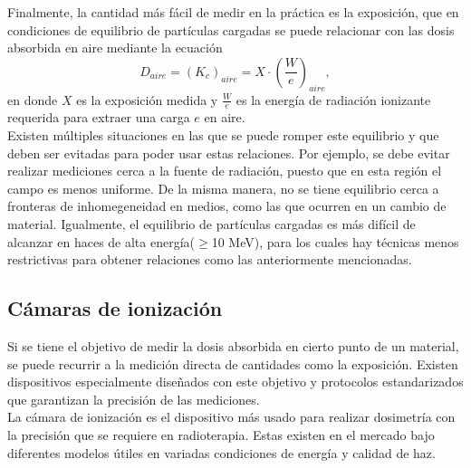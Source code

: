 Finalmente, la cantidad más fácil de medir en la práctica es la exposición, que en condiciones de equilibrio de partículas cargadas se puede relacionar con las dosis absorbida en aire mediante la ecuación \cite{Attix1986}
\begin{equation}
\label{eqn:ExpoDosis}
	D_{aire}=(K_c)_{aire}=X\cdot \left(\frac{W}{e}\right)_{aire},
\end{equation}
en donde $X$ es la exposición medida y  $\frac{W}{e}$ es la energía de radiación ionizante requerida para extraer una carga $e$ en aire.\\

Existen múltiples situaciones en las que se puede romper este equilibrio y que deben ser evitadas para poder usar estas relaciones. Por ejemplo, se debe evitar realizar mediciones cerca a la fuente de radiación, puesto que en esta región el campo es menos uniforme. De la misma manera, no se tiene equilibrio cerca a fronteras de inhomegeneidad en medios, como las que ocurren en un cambio de material. Igualmente, el equilibrio de partículas cargadas es más difícil de alcanzar en haces de alta energía($\geq$10 MeV), para los cuales hay técnicas menos restrictivas para obtener relaciones como las anteriormente mencionadas\cite{Attix1986}.  
\subsection{Cámaras de ionización}
Si se tiene el objetivo de medir la dosis absorbida en cierto punto de un material, se puede recurrir a la medición directa de cantidades como la exposición. Existen dispositivos especialmente diseñados con este objetivo y protocolos estandarizados que garantizan la precisión de las mediciones. \\

La cámara de ionización es el dispositivo más usado para realizar dosimetría con la precisión que se requiere en radioterapia. Estas existen en el mercado bajo diferentes modelos útiles en variadas condiciones de energía y calidad de haz.\\

